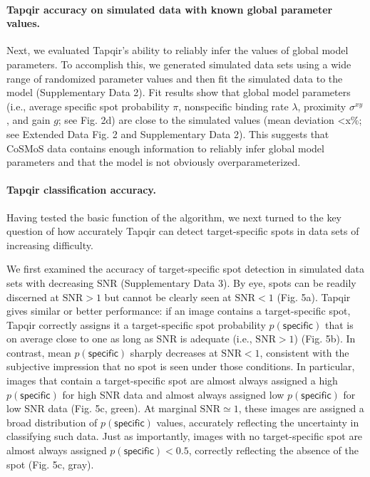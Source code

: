\paragraph{Tapqir accuracy on simulated data with known global parameter values.}
Next, we evaluated Tapqir's ability to reliably infer the values of global model parameters. To  accomplish this, we generated simulated data sets using a wide range of randomized parameter values and then fit the simulated data to the model (Supplementary Data 2). Fit results show that global model parameters (i.e., average specific spot probability $\pi$, nonspecific binding rate $\lambda$, proximity $\sigma^{xy}$, and gain $g$; see Fig. 2d) are close to the simulated values (mean deviation <x\%; see Extended Data Fig. 2 and Supplementary Data 2). This suggests that CoSMoS data contains enough information to reliably infer global model parameters and that the model is not obviously overparameterized. 

\paragraph{Tapqir classification accuracy.} Having tested the basic function of the algorithm, we next turned to the key question of how accurately Tapqir can detect target-specific spots in data sets of increasing difficulty.

We first examined the accuracy of target-specific spot detection in simulated data sets with decreasing SNR (Supplementary Data 3). By eye, spots can be readily discerned at $\mathrm{SNR}>1$ but cannot be clearly seen at $\mathrm{SNR}<1$ (Fig. 5a). Tapqir gives similar or better performance:  if an image contains a target-specific spot, Tapqir correctly assigns it a target-specific spot probability $p(\mathsf{specific})$ that is on average close to one as long as SNR is adequate (i.e., $\mathrm{SNR}>1$) (Fig. 5b).  In contrast, mean $p(\mathsf{specific})$ sharply decreases at $\mathrm{SNR}<1$, consistent with the subjective impression that no spot is seen under those conditions.  In particular, images that contain a target-specific spot are almost always assigned a high $p(\mathsf{specific})$ for high SNR data and almost always assigned low $p(\mathsf{specific})$ for low SNR data (Fig. 5c, green).  At marginal $\mathrm{SNR} \simeq 1$, these images are assigned a broad distribution of $p(\mathsf{specific})$ values, accurately reflecting the uncertainty in classifying such data.  Just as importantly, images with no target-specific spot are almost always assigned $p(\mathsf{specific}) < 0.5$, correctly reflecting the absence of the spot (Fig. 5c, gray).

